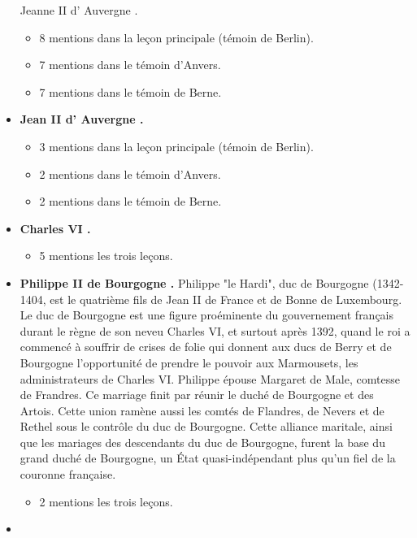 \documentclass[12pt, a4paper]{article}
\begin{document}
\begin{itemize}
{{              Jeanne
              II
              d'
              Auvergne
            .}  \begin{itemize} \item{8 mentions dans la leçon principale (témoin de Berlin).}  \item{7 mentions dans le témoin d'Anvers.}  \item{7 mentions dans le témoin de Berne.}  \end{itemize}}  \item{\textbf{
              Jean
              II
              d'
              Auvergne
            .}  \begin{itemize} \item{3 mentions dans la leçon principale (témoin de Berlin).}  \item{2 mentions dans le témoin d'Anvers.}  \item{2 mentions dans le témoin de Berne.}  \end{itemize}}  \item{\textbf{
              Charles
              VI
            .}  \begin{itemize} \item{5 mentions les trois leçons.}  \end{itemize}}  \item{\textbf{
              Philippe
              II
              de
              Bourgogne
            .} Philippe "le Hardi", duc de Bourgogne (1342-1404, est le quatrième fils de Jean II de France
              et de Bonne de Luxembourg. Le duc de Bourgogne est une figure proéminente du gouvernement français durant le règne de son neveu Charles VI,
              et surtout après 1392, quand le roi a commencé à souffrir de crises de folie qui donnent aux ducs de Berry et de Bourgogne l'opportunité de prendre
              le pouvoir aux Marmousets, les administrateurs de Charles VI. Philippe épouse Margaret de Male, comtesse de Frandres. Ce marriage finit par réunir le duché 
              de Bourgogne et des Artois. Cette union ramène aussi les comtés de Flandres, de Nevers et de Rethel sous le contrôle du duc de Bourgogne. Cette alliance 
              maritale, ainsi que les mariages des descendants du duc de Bourgogne, furent la base du grand duché de Bourgogne, un État quasi-indépendant plus qu'un fiel de la couronne française. \begin{itemize} \item{2 mentions les trois leçons.}  \end{itemize}}  \item{\textbf{
}}
\end{itemize}
\end{document}
